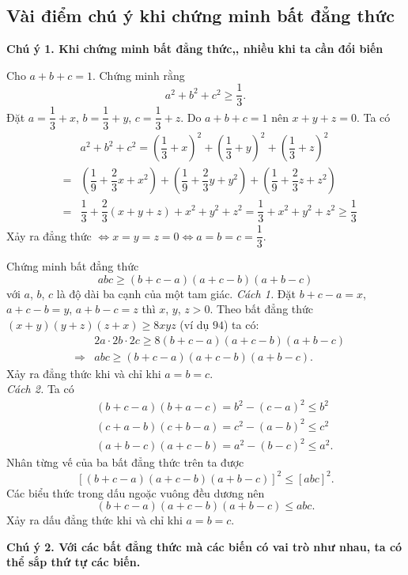 \subsection{Vài điểm chú ý khi chứng minh bất đẳng thức}
\textbf{Chú ý 1. Khi chứng minh bất đẳng thức,, nhiều khi ta cần đổi biến}
\begin{vd}%
	Cho $a+b+c=1$. Chứng minh rằng $$a^2+b^2+c^2\geq \dfrac{1}{3}.$$
	\loigiai
	{
	Đặt $a=\dfrac{1}{3}+x$, $b=\dfrac{1}{3}+y$, $c=\dfrac{1}{3}+z$. Do $a+b+c=1$ nên $x+y+z=0$. Ta có
	\begin{eqnarray*}
	&&a^2+b^2+c^2=\left(\dfrac{1}{3}+x\right)^2+\left(\dfrac{1}{3}+y\right)^2+\left(\dfrac{1}{3}+z\right)^2\\
	&=&\left(\dfrac{1}{9}+\dfrac{2}{3}x+x^2\right)+\left(\dfrac{1}{9}+\dfrac{2}{3}y+y^2\right)+\left(\dfrac{1}{9}+\dfrac{2}{3}z+z^2\right)\\
	&=&\dfrac{1}{3}+\dfrac{2}{3}\left(x+y+z\right)+x^2+y^2+z^2=\dfrac{1}{3}+x^2+y^2+z^2\geq \dfrac{1}{3} 
\end{eqnarray*}
Xảy ra đẳng thức $\Leftrightarrow x=y=z=0\Leftrightarrow a=b=c=\dfrac{1}{3}$.
	}
\end{vd}
\begin{vd}%
Chứng minh bất đẳng thức 
$$abc\geq (b+c-a)(a+c-b)(a+b-c)$$
với $a$, $b$, $c$ là độ dài ba cạnh của một tam giác.
	\loigiai
	{
\textit{Cách 1.} Đặt $b+c-a=x$, $a+c-b=y$, $a+b-c=z$ thì $x$, $y$, $z>0$. Theo bất đẳng thức $(x+y)(y+z)(z+x)\geq 8xyz$ (ví dụ $94$) ta có: 
\begin{eqnarray*}
	&&2a\cdot 2b\cdot 2c\geq 8(b+c-a)(a+c-b)(a+b-c)\\
	&\Rightarrow& abc\geq (b+c-a)(a+c-b)(a+b-c).
\end{eqnarray*}
Xảy ra đẳng thức khi và chỉ khi $a=b=c$.\\
\textit{Cách 2.} Ta có
\begin{eqnarray*}
	&&(b+c-a)(b+a-c)=b^2-(c-a)^2\leq b^2\\
	&&(c+a-b)(c+b-a)=c^2-(a-b)^2\leq c^2\\
	&&(a+b-c)(a+c-b)=a^2-(b-c)^2\leq a^2.
\end{eqnarray*}
Nhân từng vế của ba bất đẳng thức trên ta được
$$\left[(b+c-a)(a+c-b)(a+b-c)\right]^2\leq \left[abc\right]^2.$$
Các biểu thức trong dấu ngoặc vuông đều dương nên
$$(b+c-a)(a+c-b)(a+b-c)\leq abc.$$
Xảy ra dấu đẳng thức khi và chỉ khi $a=b=c$.
	}
\end{vd}
\textbf{Chú ý 2. Với các bất đẳng thức mà các biến có vai trò như nhau, ta có thể sắp thứ tự các biến.}
